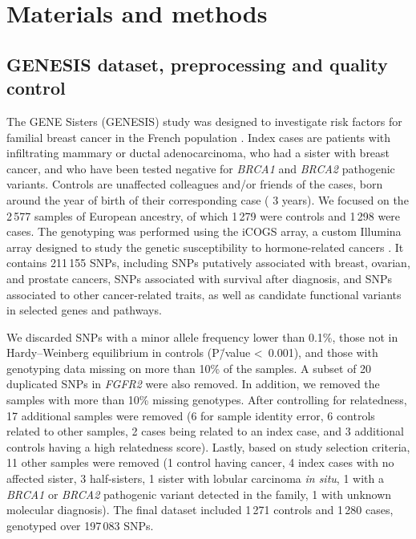 \documentclass[10pt,letterpaper]{article}
\begin{document}
\section{Materials and methods}

\subsection{GENESIS dataset, preprocessing and quality control}
\label{methods:data}

The GENE Sisters (GENESIS) study was designed to investigate risk factors for familial breast cancer in the French population \cite{sinilnikova_genesis:_2016}. Index cases are patients with infiltrating mammary or ductal adenocarcinoma, who had a sister with breast cancer, and who have been tested negative for \emph{BRCA1} and \emph{BRCA2} pathogenic variants. Controls are unaffected colleagues and/or friends of the cases, born around the year of birth of their corresponding case (\textpm{} 3 years). We focused on the 2\,577 samples of European ancestry, of which 1\,279 were controls and 1\,298 were cases. The genotyping was performed using the iCOGS array, a custom Illumina array designed to study the genetic susceptibility to hormone-related cancers \cite{sakoda_turning_2013}. It contains 211\,155 SNPs, including SNPs putatively associated with breast, ovarian, and prostate cancers, SNPs associated with survival after diagnosis, and SNPs associated to other cancer-related traits, as well as candidate functional variants in selected genes and pathways.

We discarded SNPs with a minor allele frequency lower than 0.1\%, those not in Hardy--Weinberg equilibrium in controls (P\=/value \textless~0.001), and those with genotyping data missing on more than 10\% of the samples. A subset of 20 duplicated SNPs in \emph{FGFR2} were also removed. In addition, we removed the samples with more than 10\% missing genotypes. After controlling for relatedness, 17 additional samples were removed (6 for sample identity error, 6 controls related to other samples, 2 cases being related to an index case, and 3 additional controls having a high relatedness score). Lastly, based on study selection criteria, 11 other samples were removed (1 control having cancer, 4 index cases with no affected sister, 3 half-sisters, 1 sister with lobular carcinoma \emph{in situ}, 1 with a \emph{BRCA1} or \emph{BRCA2} pathogenic variant detected in the family, 1 with unknown molecular diagnosis). The final dataset included 1\,271 controls and 1\,280 cases, genotyped over 197\,083 SNPs. 
\end{document}
